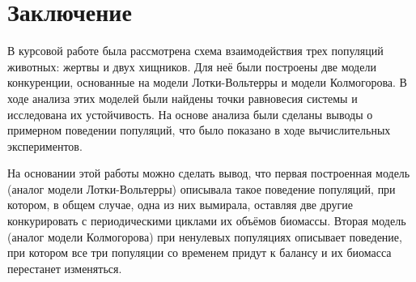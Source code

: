 \section{Заключение}
    В курсовой работе была рассмотрена схема взаимодействия трех популяций животных: жертвы и двух хищников. Для неё были построены две модели конкуренции, основанные на модели Лотки-Вольтерры и модели Колмогорова. В ходе анализа этих моделей были найдены точки равновесия системы и исследована их устойчивость. На основе анализа были сделаны выводы о примерном поведении популяций, что было показано в ходе вычислительных экспериментов.

    На основании этой работы можно сделать вывод, что первая построенная модель (аналог модели Лотки-Вольтерры) описывала такое поведение популяций, при котором, в общем случае, одна из них вымирала, оставляя две другие конкурировать с периодическими циклами их объёмов биомассы. Вторая модель (аналог модели Колмогорова) при ненулевых популяциях описывает поведение, при котором все три популяции со временем придут к балансу и их биомасса перестанет изменяться.